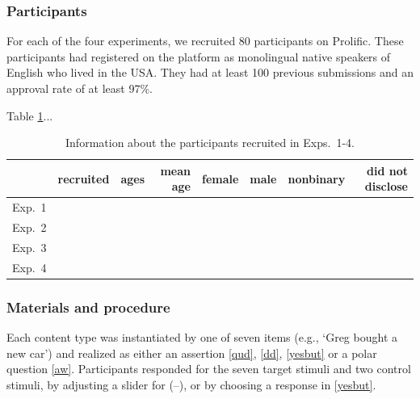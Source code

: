 \documentclass[12pt]{article}
\begin{document}
\subsubsection{Participants}

For each of the four experiments, we recruited 80 participants on Prolific. These participants had registered on the platform as
monolingual native speakers of English who lived in the USA. They had at least 100 previous submissions
and an approval rate of at least 97\%.

Table \ref{t:recruited}...

\begin{table}[h!]
\centering
\begin{tabular}{l | c | r r r r r r}
            & recruited & ages & mean age & female & male & nonbinary & did not disclose \\ \hline
Exp.~1 & &  &  & &  & &  \\
Exp.~2 & &  &  & &  & &  \\
Exp.~3 &&  &  & &  & &  \\
Exp.~4 &&  &  & &  & &  \\
\hline
\end{tabular}

\caption{Information about the participants recruited in Exps.~1-4.}\label{t:recruited}
\end{table}
      
\subsubsection{Materials and procedure}

     Each content type was instantiated by one of seven items (e.g., `Greg bought a new car') and realized as either an assertion \ref{qud}, \ref{dd}, \ref{yesbut} or a polar question \ref{aw}. Participants responded for the seven target stimuli and two control stimuli, by adjusting a slider for (--), or by choosing a response in \ref{yesbut}.
     
\end{document}
